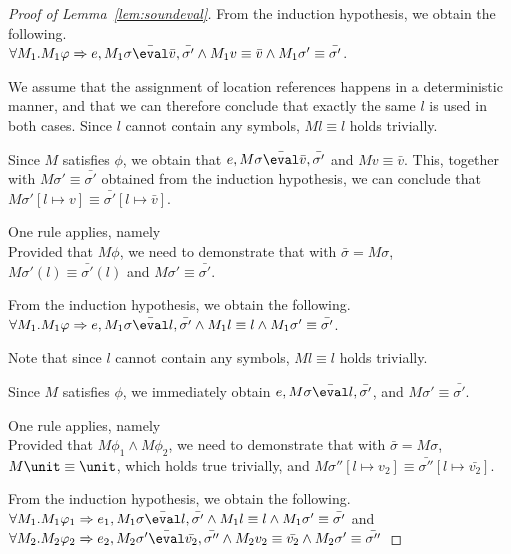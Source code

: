 \begin{proof}[Proof of Lemma~\ref{lem:soundeval}]
{  From the induction hypothesis, we obtain the following.\\
  $\forall M_1 .  M_1\phi \implies e, M_1\sigma \bar{\eval}\bar{v},\bar{\sigma'}\land  M_1v\equiv \bar{v} \wedge  M_1\sigma'\equiv\bar{\sigma'}$.

  We assume that the assignment of location references happens in a deterministic manner, and that we can therefore conclude that exactly the same $l$ is used in both cases. Since $l$ cannot contain any symbols, $M l \equiv l$ holds trivially.

  Since $M$ satisfies $\phi$,
  we obtain that $e,M\sigma \bar{\eval}\bar{v},\bar{\sigma'}$ and $M v\equiv \bar{v}$.
  This, together with $M \sigma' \equiv\bar{\sigma'}$ obtained from the induction hypothesis, we can conclude that $M\sigma'[l\mapsto v]\equiv\bar{\sigma'}[l\mapsto\bar{v}]$.
  }

  {One rule applies, namely \\
  Provided that $M\phi$, we need to demonstrate that  with $\bar{\sigma}=M\sigma$,
  $M \sigma'(l) \equiv \bar{\sigma'}(l)$ and $M\sigma'\equiv\bar{\sigma'}$.

  From the induction hypothesis, we obtain the following.\\
  $\forall M_1 .  M_1\phi \implies e, M_1\sigma \bar{\eval}l,\bar{\sigma'}\land  M_1l\equiv l \land  M_1\sigma'\equiv\bar{\sigma'}$.

  Note that since $l$ cannot contain any symbols, $M l \equiv l$ holds trivially.

  Since $M$ satisfies $\phi$,
  we immediately obtain $e,M\sigma \bar{\eval}l,\bar{\sigma'}$,
  and $M\sigma'\equiv\bar{\sigma'}$.
}

  {
  One rule applies, namely \\
  Provided that $M\phi_1\wedge M\phi_2$,
  we need to demonstrate that  with $\bar{\sigma}=M\sigma$,
  $M\unit \equiv \unit$, which holds true trivially,
  and $M\sigma''[l\mapsto v_2]\equiv\bar{\sigma''}[l\mapsto\bar{v_2}]$.

  From the induction hypothesis, we obtain the following.\\
  $\forall M_1 .  M_1\phi_1 \implies e_1, M_1\sigma \bar{\eval}l,\bar{\sigma'}\land  M_1 l\equiv l \land  M_1\sigma'\equiv\bar{\sigma'}$ and\\
  $\forall M_2 . M_2\phi_2 \implies e_2,M_2\sigma' \bar{\eval}\bar{v_2},\bar{\sigma''}\land M_2v_2\equiv \bar{v_2} \land M_2\sigma'\equiv\bar{\sigma''}$

}
\end{proof}
